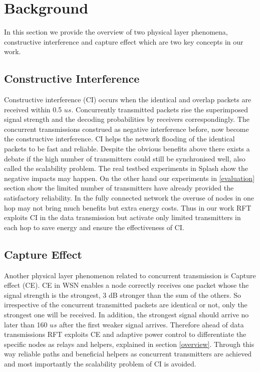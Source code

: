 \documentclass[conference]{IEEEtran}
\begin{document}
\section{Background}
\label{background}
In this section we provide the overview of two physical layer phenomena, constructive interference and capture effect which are two key concepts in our work. 
\subsection{Constructive Interference}
Constructive interference (CI) occurs when the identical and overlap packets are received within 0.5 $us$. Concurrently transmitted packets rise the superimposed signal strength and the decoding probabilities by receivers correspondingly. The concurrent transmissions construed as negative interference before, now become the constructive interference. CI helps the network flooding of the identical packets to be fast and reliable. Despite the obvious benefits above there exists a debate if the high number of transmitters could still be synchronised well, also called the scalability problem. The real testbed experiments in Splash \cite{doddavenkatappa2013splash} show the negative impacts may happen. On the other hand our experiments in \ref{evaluation} section show the limited number of transmitters have already provided the satisfactory reliability. In the fully connected network the overuse of nodes in one hop may not bring much benefits but extra energy costs. Thus in our work RFT exploits CI in the data transmission but activate only limited transmitters in each hop to save energy and ensure the effectiveness of CI.
\subsection{Capture Effect}
Another physical layer phenomenon related to concurrent transmission is Capture effect (CE). CE in WSN enables a node correctly receives one packet whose the signal strength is the strongest, 3 dB stronger than the sum of the others. So irrespective of the concurrent transmitted packets are identical or not, only the strongest one will be received. In addition, the strongest signal should arrive no later than 160 $us$ after the first weaker signal arrives. Therefore ahead of data transmissions RFT exploits CE and adaptive power control to differentiate the specific nodes as relays and helpers, explained in section \ref{overview}. Through this way reliable paths and beneficial helpers as concurrent transmitters are achieved and most importantly the scalability problem of CI is avoided.
\end{document}
